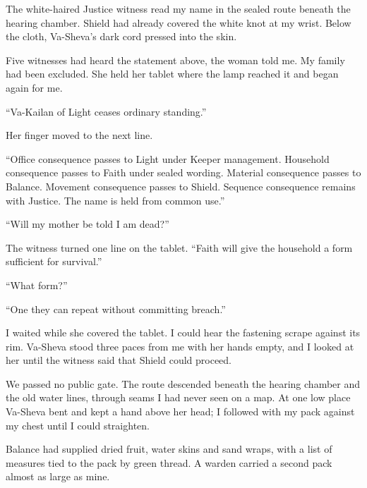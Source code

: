 
\ornament

The white-haired Justice witness read my name in the sealed route beneath the hearing chamber. Shield had already covered the white knot at my wrist. Below the cloth, Va-Sheva's dark cord pressed into the skin.\par

Five witnesses had heard the statement above, the woman told me. My family had been excluded. She held her tablet where the lamp reached it and began again for me.\par

``Va-Kailan of Light ceases ordinary standing.''\par

Her finger moved to the next line.\par

``Office consequence passes to Light under Keeper management. Household consequence passes to Faith under sealed wording. Material consequence passes to Balance. Movement consequence passes to Shield. Sequence consequence remains with Justice. The name is held from common use.''\par

``Will my mother be told I am dead?''\par

The witness turned one line on the tablet. ``Faith will give the household a form sufficient for survival.''\par

``What form?''\par

``One they can repeat without committing breach.''\par

I waited while she covered the tablet. I could hear the fastening scrape against its rim. Va-Sheva stood three paces from me with her hands empty, and I looked at her until the witness said that Shield could proceed.\par

We passed no public gate. The route descended beneath the hearing chamber and the old water lines, through seams I had never seen on a map. At one low place Va-Sheva bent and kept a hand above her head; I followed with my pack against my chest until I could straighten.\par

Balance had supplied dried fruit, water skins and sand wraps, with a list of measures tied to the pack by green thread. A warden carried a second pack almost as large as mine.\par


